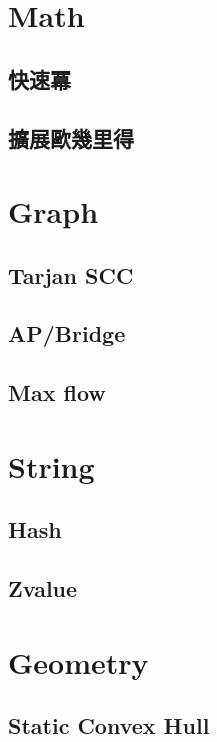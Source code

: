 \section{Math}
\subsection{快速冪} 

\subsection{擴展歐幾里得} 


\section{Graph}
\subsection{Tarjan SCC} 

\subsection{AP/Bridge} 

\subsection{Max flow} 


\section{String}
\subsection{Hash} 

\subsection{Zvalue} 


\section{Geometry}
\subsection{Static Convex Hull} 
